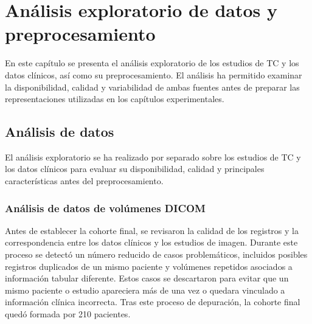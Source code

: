 \chapter{Análisis exploratorio de datos y preprocesamiento}\label{chap:eda}

En este capítulo se presenta el análisis exploratorio de los estudios de TC y los datos clínicos, así como su preprocesamiento. El análisis ha permitido examinar la disponibilidad, calidad y variabilidad de ambas fuentes antes de preparar las representaciones utilizadas en los capítulos experimentales.

\section{Análisis de datos}


El análisis exploratorio se ha realizado por separado sobre los estudios de TC y los datos clínicos para evaluar su disponibilidad, calidad y principales características antes del preprocesamiento.

\subsection{Análisis de datos de volúmenes DICOM}
Antes de establecer la cohorte final, se revisaron la calidad de los registros y la correspondencia entre los datos clínicos y los estudios de imagen. Durante este proceso se detectó un número reducido de casos problemáticos, incluidos posibles registros duplicados de un mismo paciente y volúmenes repetidos asociados a información tabular diferente. Estos casos se descartaron para evitar que un mismo paciente o estudio apareciera más de una vez o quedara vinculado a información clínica incorrecta. Tras este proceso de depuración, la cohorte final quedó formada por 210 pacientes.

